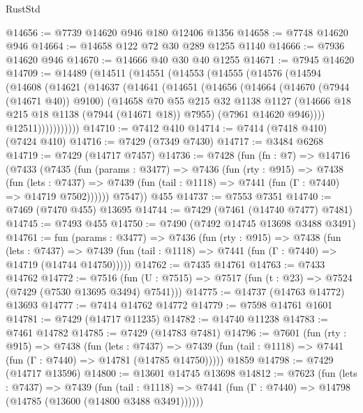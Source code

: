 \begin{lexlean}{RustStd}
\begin{coremodule}
@14656 := @7739 @14620 @946 @180 @12406 @1356
@14658 := @7748 @14620 @946
@14664 := @14658 @122 @72 @30 @289 @1255 @1140
@14666 := @7936 @14620 @946
@14670 := @14666 @40 @30 @40 @1255
@14671 := @7945 @14620
@14709 := @14489
    (@14511
      (@14551
        (@14553
          (@14555
            (@14576
              (@14594
                (@14608
                  (@14621
                    (@14637
                      (@14641
                        (@14651
                          (@14656
                            (@14664
                              (@14670 (@7944 (@14671 @40)) @9100)
                              (@14658
                                @70
                                @55
                                @215
                                @32
                                @1138
                                @1127
                                (@14666 @18 @215 @18 @1138 (@7944 (@14671 @18)) @7955)
                                (@7961 @14620 @946))))
                          @12511)))))))))))
@14710 := @7412 @410
@14714 := @7414 (@7418 @410) (@7424 @410)
@14716 := @7429 (@7349 @7430)
@14717 := @3484 @6268
@14719 := @7429 (@14717 @7457)
@14736 := @7428
    (fun (fn : @7) =>
    @14716
      (@7433
        (@7435
          (fun (params : @3477) =>
          @7436
            (fun (rty : @915) =>
            @7438
              (fun (lets : @7437) =>
              @7439 (fun (tail : @1118) => @7441 (fun (Γ : @7440) => @14719 @7502))))))
        @7547))
    @455
@14737 := @7553 @7351
@14740 := @7469 (@7470 @455) @13695
@14744 := @7429 (@7461 (@14740 @7477) @7481)
@14745 := @7493 @455
@14750 := @7490 (@7492 @14745 @13698 @3488 @3491)
@14761 := fun (params : @3477) =>
  @7436
    (fun (rty : @915) =>
    @7438
      (fun (lets : @7437) =>
      @7439 (fun (tail : @1118) => @7441 (fun (Γ : @7440) => @14719 (@14744 @14750)))))
@14762 := @7435 @14761
@14763 := @7433 @14762
@14772 := @7516
    (fun (U : @7515) => @7517 (fun (t : @23) => @7524 (@7429 (@7530 @13695 @3494) @7541)))
@14775 := @14737 (@14763 @14772) @13693
@14777 := @7414 @14762 @14772
@14779 := @7598 @14761 @1601
@14781 := @7429 (@14717 @11235)
@14782 := @14740 @11238
@14783 := @7461 @14782
@14785 := @7429 (@14783 @7481)
@14796 := @7601
    (fun (rty : @915) =>
    @7438
      (fun (lets : @7437) =>
      @7439 (fun (tail : @1118) => @7441 (fun (Γ : @7440) => @14781 (@14785 @14750)))))
    @1859
@14798 := @7429 (@14717 @13596)
@14800 := @13601 @14745 @13698
@14812 := @7623
    (fun (lets : @7437) =>
    @7439
      (fun (tail : @1118) =>
      @7441 (fun (Γ : @7440) => @14798 (@14785 (@13600 (@14800 @3488 @3491))))))

\end{coremodule}
\end{lexlean}
